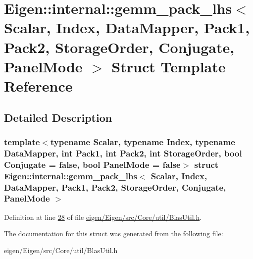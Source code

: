 \hypertarget{struct_eigen_1_1internal_1_1gemm__pack__lhs}{}\section{Eigen\+:\+:internal\+:\+:gemm\+\_\+pack\+\_\+lhs$<$ Scalar, Index, Data\+Mapper, Pack1, Pack2, Storage\+Order, Conjugate, Panel\+Mode $>$ Struct Template Reference}
\label{struct_eigen_1_1internal_1_1gemm__pack__lhs}


\subsection{Detailed Description}
\subsubsection*{template$<$typename Scalar, typename Index, typename Data\+Mapper, int Pack1, int Pack2, int Storage\+Order, bool Conjugate = false, bool Panel\+Mode = false$>$\newline
struct Eigen\+::internal\+::gemm\+\_\+pack\+\_\+lhs$<$ Scalar, Index, Data\+Mapper, Pack1, Pack2, Storage\+Order, Conjugate, Panel\+Mode $>$}



Definition at line \hyperlink{eigen_2_eigen_2src_2_core_2util_2_blas_util_8h_source_l00028}{28} of file \hyperlink{eigen_2_eigen_2src_2_core_2util_2_blas_util_8h_source}{eigen/\+Eigen/src/\+Core/util/\+Blas\+Util.\+h}.



The documentation for this struct was generated from the following file\+:\begin{DoxyCompactItemize}
\item 
eigen/\+Eigen/src/\+Core/util/\+Blas\+Util.\+h\end{DoxyCompactItemize}

